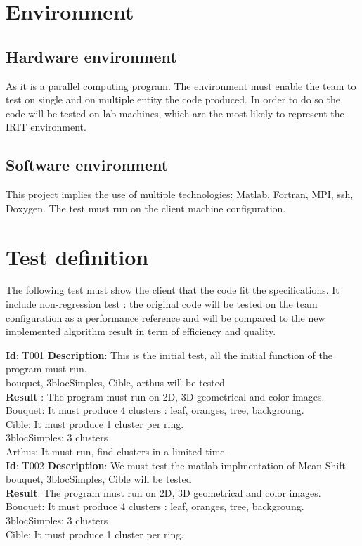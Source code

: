 
\section{Environment}
\subsection{Hardware environment}
As it is a parallel computing program. The environment must enable the team to test on single and on multiple entity the code produced. In order to do so the code will be tested on lab machines, which are the most likely to represent the IRIT environment. 
\subsection{Software environment}
This project implies the use of multiple technologies: Matlab, Fortran, MPI, ssh, Doxygen. The test must run on the client machine configuration.

\section{Test definition}
The following test must show the client that the code fit the specifications. It include non-regression test : the original code will be tested on the team configuration as a performance reference and will be compared to the new implemented algorithm result in term of efficiency and quality.

\textbf{Id}: T001
\textbf{Description}: This is the initial test, all the initial function of the program must run. \\
bouquet, 3blocSimples, Cible, arthus will be tested\\
\textbf{Result} : The program must run on 2D, 3D geometrical and color images. \\
Bouquet: It must produce 4 clusters : leaf, oranges, tree, backgroung.\\
Cible: It must produce 1 cluster per ring.\\
3blocSimples: 3 clusters\\
Arthus: It must run, find clusters in a limited time.\\

\textbf{Id}: T002
\textbf{Description}: We must test the matlab implmentation of Mean Shift \\
bouquet, 3blocSimples, Cible will be tested\\
\textbf{Result}: The program must run on 2D, 3D geometrical and color images. \\
Bouquet: It must produce 4 clusters : leaf, oranges, tree, backgroung.\\
3blocSimples: 3 clusters\\
Cible: It must produce 1 cluster per ring.\\

